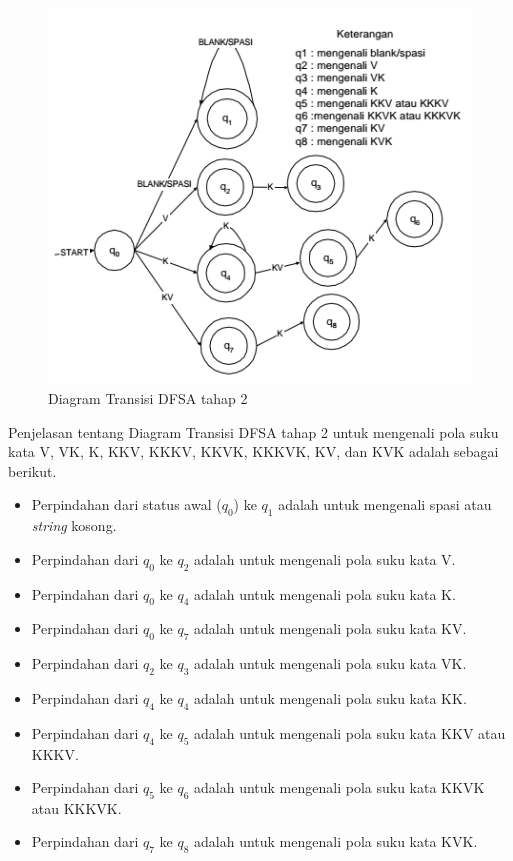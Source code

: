 \begin{figure}[H]
	\centering
	\includegraphics[scale=1.3]{Gambar/DFSA-2}
	\caption{Diagram Transisi DFSA tahap 2\cite{Thomas:2000} 
	\label{fig:2-DFSA-2}}
\end{figure}

Penjelasan tentang Diagram Transisi DFSA tahap 2 untuk mengenali pola suku kata V, VK, K, KKV, KKKV, KKVK, KKKVK, KV, dan KVK adalah sebagai berikut.

\begin{itemize}
	\item Perpindahan dari status awal (\textit{$q_0$}) ke \textit{$q_1$} adalah untuk mengenali spasi atau \textit{string} kosong.
	\item Perpindahan dari \textit{$q_0$} ke \textit{$q_2$} adalah untuk mengenali pola suku kata V.
	\item Perpindahan dari \textit{$q_0$} ke \textit{$q_4$} adalah untuk mengenali pola suku kata K.
	\item Perpindahan dari \textit{$q_0$} ke \textit{$q_7$} adalah untuk mengenali pola suku kata KV.
	\item Perpindahan dari \textit{$q_2$} ke \textit{$q_3$} adalah untuk mengenali pola suku kata VK.
	\item Perpindahan dari \textit{$q_4$} ke \textit{$q_4$} adalah untuk mengenali pola suku kata KK.
	\item Perpindahan dari \textit{$q_4$} ke \textit{$q_5$} adalah untuk mengenali pola suku kata KKV atau KKKV.
	\item Perpindahan dari \textit{$q_5$} ke \textit{$q_6$} adalah untuk mengenali pola suku kata KKVK atau KKKVK.
	\item Perpindahan dari \textit{$q_7$} ke \textit{$q_8$} adalah untuk mengenali pola suku kata KVK.
\end{itemize}

